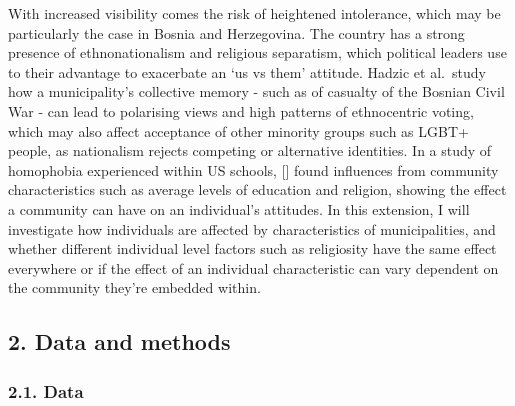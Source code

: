 \documentclass[
]{article}
\newenvironment{Shaded}{\begin{snugshade}}{\end{snugshade}}
\newcommand{\AttributeTok}[1]{\textcolor[rgb]{0.77,0.63,0.00}{#1}}
\newcommand{\CommentTok}[1]{\textcolor[rgb]{0.56,0.35,0.01}{\textit{#1}}}
\newcommand{\DecValTok}[1]{\textcolor[rgb]{0.00,0.00,0.81}{#1}}
\newcommand{\FunctionTok}[1]{\textcolor[rgb]{0.00,0.00,0.00}{#1}}
\newcommand{\NormalTok}[1]{#1}
\newcommand{\OtherTok}[1]{\textcolor[rgb]{0.56,0.35,0.01}{#1}}
\newcommand{\SpecialCharTok}[1]{\textcolor[rgb]{0.00,0.00,0.00}{#1}}
\newcommand{\StringTok}[1]{\textcolor[rgb]{0.31,0.60,0.02}{#1}}
\begin{document}
With increased visibility comes the risk of heightened intolerance,
which may be particularly the case in Bosnia and Herzegovina. The
country has a strong presence of ethnonationalism and religious
separatism, which political leaders use to their advantage to exacerbate
an `us vs them' attitude. Hadzic et al.~study how a municipality's
collective memory - such as of casualty of the Bosnian Civil War - can
lead to polarising views and high patterns of ethnocentric voting, which
may also affect acceptance of other minority groups such as LGBT+
people, as nationalism rejects competing or alternative identities. In a
study of homophobia experienced within US schools, {[}{]} found
influences from community characteristics such as average levels of
education and religion, showing the effect a community can have on an
individual's attitudes. In this extension, I will investigate how
individuals are affected by characteristics of municipalities, and
whether different individual level factors such as religiosity have the
same effect everywhere or if the effect of an individual characteristic
can vary dependent on the community they're embedded within.

\hypertarget{data-and-methods}{%
\subsection{2. Data and methods}\label{data-and-methods}}

\hypertarget{data}{%
\subsubsection{2.1. Data}\label{data}}

\begin{Shaded}
\end{Shaded}
\end{document}
